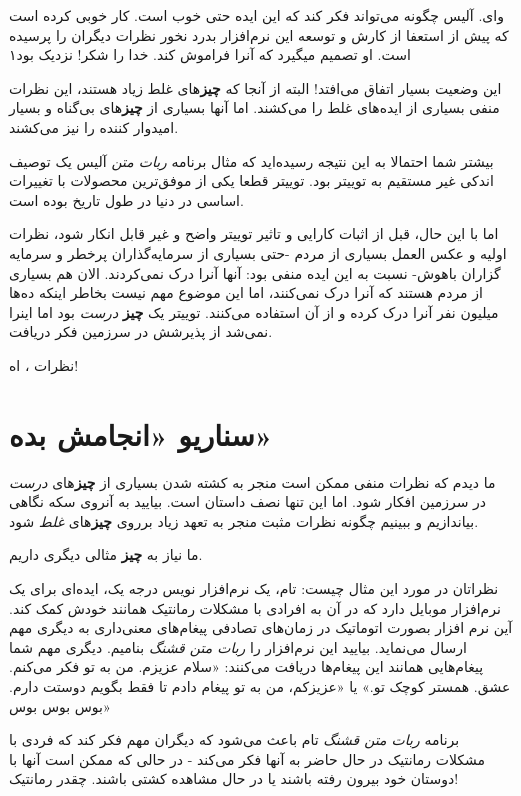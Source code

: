 وای. آلیس چگونه می‌تواند فکر کند که این ایده حتی خوب است. کار خوبی کرده
است که پیش از استعفا از کارش و توسعه این نرم‌افزار بدرد نخور نظرات
دیگران را پرسیده است. او تصمیم میگیرد که آنرا فراموش کند. خدا را شکر!
نزدیک بود۱

این وضعیت بسیار اتفاق می‌افتد! البته از آنجا که \textbf{چیز}های غلط زیاد
هستند، این نظرات منفی بسیاری از ایده‌های غلط را می‌کشند. اما آنها بسیاری
از \textbf{چیز}های بی‌گناه و بسیار امیدوار کننده را نیز می‌کشند.

بیشتر شما احتمالا به این نتیجه رسیده‌اید که مثال برنامه \emph{ربات متن}
آلیس یک توصیف اندکی غیر مستقیم به توییتر بود. توییتر قطعا یکی از
موفق‌ترین محصولات با تغییرات اساسی در دنیا در طول تاریخ بوده است.

اما با این حال، قبل از اثبات کارایی و تاثیر توییتر واضح و غیر قابل انکار
شود، نظرات اولیه و عکس العمل بسیاری از مردم -حتی بسیاری از سرمایه‌گذاران
پرخطر و سرمایه گزاران باهوش- نسبت به این ایده منفی بود: آنها آنرا درک
نمی‌کردند. الان هم بسیاری از مردم هستند که آنرا درک نمی‌کنند، اما این
موضوع مهم نیست بخاطر اینکه ده‌ها میلیون نفر آنرا درک کرده و از آن
استفاده می‌کنند. توییتر یک \textbf{چیز} \emph{درست} بود اما اینرا نمی‌شد
از پذیرشش در سرزمین فکر دریافت.

نظرات ، اه!

\section{سناریو «انجامش
بده»}\label{ux633ux646ux627ux631ux6ccux648-ux627ux646ux62cux627ux645ux634-ux628ux62fux647}

ما دیدم که نظرات منفی ممکن است منجر به کشته شدن بسیاری از
\textbf{چیز}های \emph{درست} در سرزمین افکار شود. اما این تنها نصف داستان
است. بیایید به آنروی سکه نگاهی بیاندازیم و ببینیم چگونه نظرات مثبت منجر
به تعهد زیاد برروی \textbf{چیز}های \emph{غلط} شود.

ما نیاز به \textbf{چیز} مثالی دیگری داریم.

نظراتان در مورد این مثال چیست: تام، یک نرم‌افزار نویس درجه یک، ایده‌ای
برای یک نرم‌افزار موبایل دارد که در آن به افرادی با مشکلات رمانتیک
همانند خودش کمک کند. آین نرم افزار بصورت اتوماتیک در زمان‌های تصادفی
پیغام‌های معنی‌داری به دیگری مهم ارسال می‌نماید. بیایید این نرم‌افزار را
\emph{ربات متن قشنگ} بنامیم. دیگری مهم شما پیغام‌هایی همانند این
پیغام‌ها دریافت می‌کنند: «سلام عزیزم. من به تو فکر می‌کنم. عشق. همستر
کوچک تو.» یا «عزیزکم، من به تو پیغام دادم تا فقط بگویم دوستت دارم. بوس
بوس بوس»

برنامه \emph{ربات متن قشنگ} تام باعث می‌شود که دیگران مهم فکر کند که
فردی با مشکلات رمانتیک در حال حاضر به آنها فکر می‌کند - در حالی که ممکن
است آنها با دوستان خود بیرون رفته باشند یا در حال مشاهده کشتی باشند.
چقدر رمانتیک!

